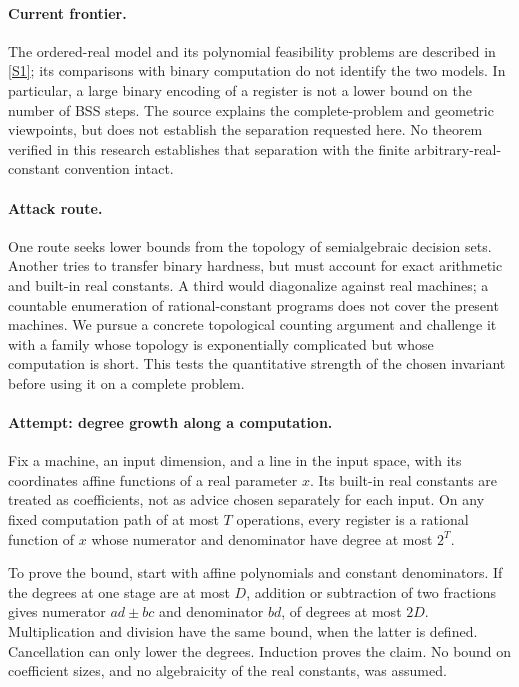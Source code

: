 \documentclass[11pt,a4paper]{article}
\newcommand{\sref}[2]{\hyperlink{source:#1:#2}{[S#2]}}
\numberwithin{equation}{section}
\begin{document}
\paragraph{Current frontier.}
The ordered-real model and its polynomial feasibility problems are described
in \sref{30006767}{1}; its comparisons with binary computation do not identify
the two models. In particular, a large binary encoding of a register is
not a lower bound on the number of BSS steps. The source explains the
complete-problem and geometric viewpoints, but does not establish the
separation requested here. No theorem verified in this research establishes
that separation with the finite arbitrary-real-constant convention intact.

\paragraph{Attack route.}
One route seeks lower bounds from the topology of semialgebraic decision
sets. Another tries to transfer binary hardness, but must account for exact
arithmetic and built-in real constants. A third would diagonalize against
real machines; a countable enumeration of rational-constant programs does
not cover the present machines. We pursue a concrete topological counting
argument and challenge it with a family whose topology is exponentially
complicated but whose computation is short. This tests the quantitative
strength of the chosen invariant before using it on a complete problem.

\paragraph{Attempt: degree growth along a computation.}
Fix a machine, an input dimension, and a line in the input space, with its
coordinates affine functions of a real parameter $x$. Its built-in real
constants are treated as coefficients, not as advice chosen separately for
each input. On any fixed computation path of at most $T$ operations, every
register is a rational function of $x$ whose numerator and denominator
have degree at most $2^T$.

To prove the bound, start with affine polynomials and constant denominators.
If the degrees at one stage are at most $D$, addition or subtraction of two
fractions gives numerator $ad\pm bc$ and denominator $bd$, of degrees at
most $2D$. Multiplication and division have the same bound, when the latter
is defined. Cancellation can only lower the degrees. Induction proves the
claim. No bound on coefficient sizes, and no algebraicity of the real
constants, was assumed.
\end{document}
